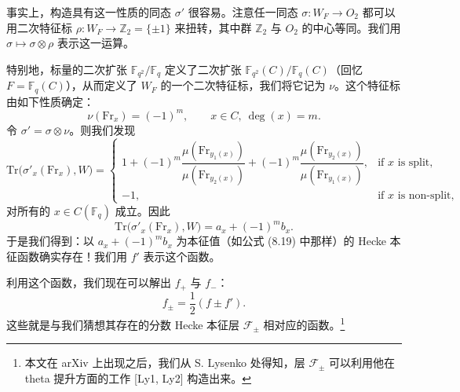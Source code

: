 \documentclass[11pt,a4paper]{article}
\begin{document}

事实上，构造具有这一性质的同态 $\sigma'$ 很容易。注意任一同态 $\sigma : W_F \to O_2$ 都可以用二次特征标 $\rho : W_F \to \mathbb{Z}_2 = \{\pm 1\}$ 来扭转，其中群 $\mathbb{Z}_2$ 与 $O_2$ 的中心等同。我们用 $\sigma \mapsto \sigma\otimes\rho$ 表示这一运算。

特别地，标量的二次扩张 $\mathbb{F}_{q^2}/\mathbb{F}_q$ 定义了二次扩张 $\mathbb{F}_{q^2}(C)/\mathbb{F}_q(C)$（回忆 $F = \mathbb{F}_q(C)$），从而定义了 $W_F$ 的一个二次特征标，我们将它记为 $\nu$。这个特征标由如下性质确定：
\begin{equation}\tag{8.20}
\nu(\mathrm{Fr}_x) = (-1)^m, \qquad x\in C,\ \deg(x) = m.
\end{equation}
令 $\sigma' = \sigma\otimes \nu$。则我们发现
\[
\mathrm{Tr}\bigl(\sigma'_x(\mathrm{Fr}_x), W\bigr) = \begin{cases} 1 + (-1)^m\dfrac{\mu(\mathrm{Fr}_{y_1(x)})}{\mu(\mathrm{Fr}_{y_2(x)})} + (-1)^m\dfrac{\mu(\mathrm{Fr}_{y_2(x)})}{\mu(\mathrm{Fr}_{y_1(x)})}, & \text{if } x \text{ is split},\\[10pt] -1, & \text{if } x \text{ is non-split},\end{cases}
\]
对所有的 $x\in C(\mathbb{F}_q)$ 成立。因此
\[
\mathrm{Tr}\bigl(\sigma'_x(\mathrm{Fr}_x), W\bigr) = a_x + (-1)^m b_x.
\]
于是我们得到：以 $a_x + (-1)^m b_x$ 为本征值（如公式 (8.19) 中那样）的 Hecke 本征函数确实存在！我们用 $f'$ 表示这个函数。

利用这个函数，我们现在可以解出 $f_+$ 与 $f_-$：
\begin{equation}\tag{8.21}
f_\pm = \frac{1}{2}(f\pm f').
\end{equation}
这些就是与我们猜想其存在的分数 Hecke 本征层 $\mathcal{F}_\pm$ 相对应的函数。\footnote{本文在 arXiv 上出现之后，我们从 S. Lysenko 处得知，层 $\mathcal{F}_\pm$ 可以利用他在 theta 提升方面的工作 [Ly1, Ly2] 构造出来。}

\end{document}
